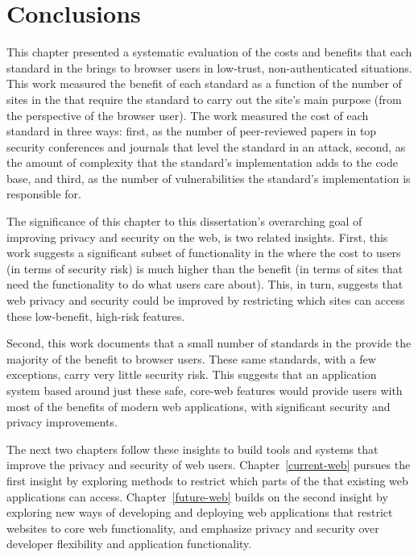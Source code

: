 \section{Conclusions}
\label{cost-benefit:conclusions}

This chapter presented a systematic evaluation of the costs and benefits that
each standard in the \WAPI brings to browser users in low-trust,
non-authenticated situations.  This work measured the benefit of each
standard as a function of the number of sites in the \ATK that require
the standard to carry out the site's main purpose (from the perspective
of the browser user).  The work measured the cost
of each standard in three ways: first, as the number of peer-reviewed papers
in top security conferences and journals that level the standard in an attack,
second, as the amount of complexity that the standard's implementation adds
to the code base, and third, as the number of vulnerabilities the standard's
implementation is responsible for.

The significance of this chapter to this dissertation's overarching goal of
improving privacy and security on the web, is two related insights.  First,
this work suggests a significant subset of functionality in the \WAPI where the
cost to users (in terms of security risk) is much higher than the benefit (in
terms of sites that need the functionality to do what users care about).  This,
in turn, suggests that web privacy and security could be improved by
restricting which sites can access these low-benefit, high-risk features.

Second, this work documents that a small number of standards in the \WAPI
provide the majority of the benefit to browser users.  These same standards,
with a few exceptions, carry very little security risk. This suggests
that an application system based around just these safe, core-web features
would provide users with most of the benefits of modern web applications, with
significant security and privacy improvements.

The next two chapters follow these insights to build tools and systems that
improve the privacy and security of web users.  Chapter~\ref{current-web}
pursues the first insight by exploring methods to restrict which parts of the
\WAPI that existing web applications can access.  Chapter~\ref{future-web}
builds on the second insight by exploring new ways of developing and deploying
web applications that restrict websites to core web functionality, and
emphasize privacy and security over developer flexibility and application
functionality.
